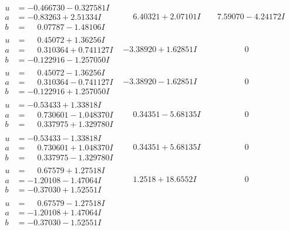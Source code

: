 \documentclass[1p]{elsarticle_modified}
\theoremstyle{definition}
\begin{document}
$$\begin{array}{c|c|c}
\begin{aligned}
u &= -0.466730 - 0.327581 I \\
a &= -0.83263 + 2.51334 I \\
b &= \phantom{-}0.07787 - 1.48106 I\end{aligned}
 & \phantom{-}6.40321 + 2.07101 I & \phantom{-}7.59070 - 4.24172 I \\ \hline\begin{aligned}
u &= \phantom{-}0.45072 + 1.36256 I \\
a &= \phantom{-}0.310364 + 0.741127 I \\
b &= -0.122916 - 1.257050 I\end{aligned}
 & -3.38920 + 1.62851 I & \phantom{-0.000000 } 0 \\ \hline\begin{aligned}
u &= \phantom{-}0.45072 - 1.36256 I \\
a &= \phantom{-}0.310364 - 0.741127 I \\
b &= -0.122916 + 1.257050 I\end{aligned}
 & -3.38920 - 1.62851 I & \phantom{-0.000000 } 0 \\ \hline\begin{aligned}
u &= -0.53433 + 1.33818 I \\
a &= \phantom{-}0.730601 - 1.048370 I \\
b &= \phantom{-}0.337975 + 1.329780 I\end{aligned}
 & \phantom{-}0.34351 - 5.68135 I & \phantom{-0.000000 } 0 \\ \hline\begin{aligned}
u &= -0.53433 - 1.33818 I \\
a &= \phantom{-}0.730601 + 1.048370 I \\
b &= \phantom{-}0.337975 - 1.329780 I\end{aligned}
 & \phantom{-}0.34351 + 5.68135 I & \phantom{-0.000000 } 0 \\ \hline\begin{aligned}
u &= \phantom{-}0.67579 + 1.27518 I \\
a &= -1.20108 - 1.47064 I \\
b &= -0.37030 + 1.52551 I\end{aligned}
 & \phantom{-}1.2518 + 18.6552 I & \phantom{-0.000000 } 0 \\ \hline\begin{aligned}
u &= \phantom{-}0.67579 - 1.27518 I \\
a &= -1.20108 + 1.47064 I \\
b &= -0.37030 - 1.52551 I\end{aligned}

\end{array}$$
\end{document}
